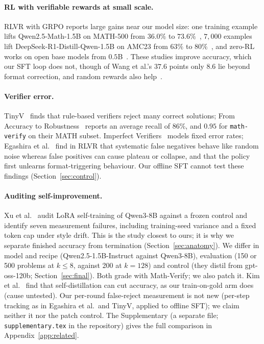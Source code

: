 \documentclass[runningheads]{llncs}
\begin{document}
\paragraph{RL with verifiable rewards at small scale.}
RLVR with GRPO reports large gains near our model size: one training example
lifts Qwen2.5-Math-1.5B on MATH-500 from $36.0\%$ to $73.6\%$~\cite{ref_oneshot},
$7{,}000$ examples lift DeepSeek-R1-Distill-Qwen-1.5B on AMC23 from $63\%$
to $80\%$~\cite{ref_openrs}, and zero-RL works on open base models from $0.5$B~\cite{ref_simplerl}. These studies improve
accuracy, which our SFT loop does not, though of Wang et al.'s $37.6$ points only $8.6$ lie beyond format correction, and random rewards also help~\cite{ref_spurious}.

\paragraph{Verifier error.}
TinyV~\cite{ref_tinyv} finds that rule-based verifiers reject many correct
solutions; From Accuracy to Robustness~\cite{ref_robustness} reports an average
recall of $86\%$, and $0.95$ for \texttt{math-verify} on their MATH subset.
Imperfect Verifiers~\cite{ref_imperfect} models fixed error rates; Egashira et al.~\cite{ref_delayplateau} find in RLVR that
systematic false negatives behave like random noise whereas false positives can
cause plateau or collapse, and that the policy first unlearns format-triggering behaviour. Our offline SFT cannot test these findings (Section~\ref{sec:control}).

\paragraph{Auditing self-improvement.}
Xu et al.~\cite{ref_phantom} audit LoRA self-training of Qwen3-8B against a
frozen control and identify seven measurement failures, including training-seed
variance and a fixed token cap under style drift. This is the study closest to ours; it is why we separate
finished accuracy from termination (Section~\ref{sec:anatomy}). We differ in model and recipe (Qwen2.5-1.5B-Instruct against Qwen3-8B), evaluation (150 or 500 problems at $k\le8$, against 200 at $k=128$) and control (they distil from gpt-oss-120b; Section~\ref{sec:final}).
Both grade with Math-Verify; we also patch it. Kim et al.~\cite{ref_selfdistill} find that self-distillation can cut accuracy, as our train-on-gold arm does (cause untested). Our per-round false-reject measurement
is not new (per-step tracking as in
Egashira et al.\ and TinyV, applied to offline SFT); we claim neither it nor the patch control. The Supplementary (a separate file; \texttt{supplementary.tex} in the repository) gives the full comparison in Appendix~\ref{app:related}.
\end{document}
